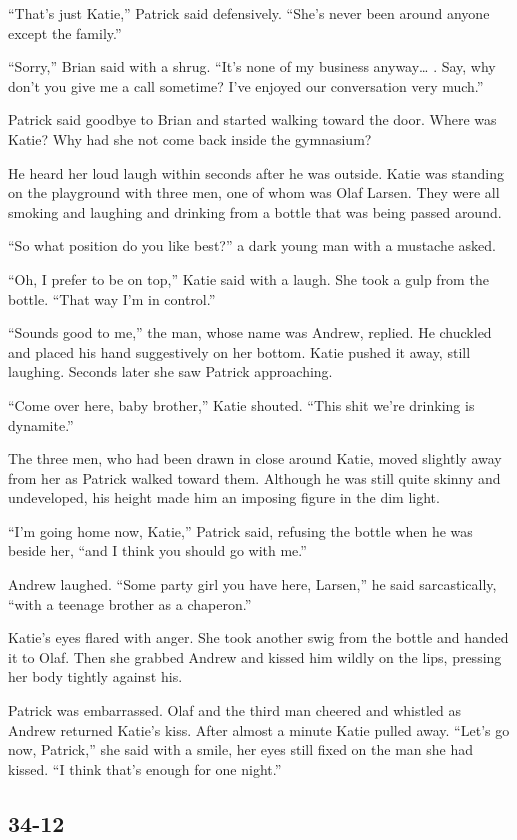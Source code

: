 \documentclass[]{article}
\begin{document}
{“That’s just Katie,” Patrick said defensively.  “She’s never been around anyone except the family.”

“Sorry,” Brian said with a shrug.  “It’s none of my business anyway… .  Say, why don’t you give me a call sometime? I’ve enjoyed our conversation very much.”

Patrick said goodbye to Brian and started walking toward the door.  Where was Katie? Why had she not come back inside the gymnasium?

He heard her loud laugh within seconds after he was outside.  Katie was standing on the playground with three men, one of whom was Olaf Larsen.  They were all smoking and laughing and drinking from a bottle that was being passed around.

“So what position do you like best?” a dark young man with a mustache asked.

“Oh, I prefer to be on top,” Katie said with a laugh.  She took a gulp from the bottle.  “That way I’m in control.”

“Sounds good to me,” the man, whose name was Andrew, replied.  He chuckled and placed his hand suggestively on her bottom.  Katie pushed it away, still laughing.  Seconds later she saw Patrick approaching.

“Come over here, baby brother,” Katie shouted.  “This shit we’re drinking is dynamite.”

The three men, who had been drawn in close around Katie, moved slightly away from her as Patrick walked toward them.  Although he was still quite skinny and undeveloped, his height made him an imposing figure in the dim light.

“I’m going home now, Katie,” Patrick said, refusing the bottle when he was beside her, “and I think you should go with me.”

Andrew laughed.  “Some party girl you have here, Larsen,” he said sarcastically, “with a teenage brother as a chaperon.”

Katie’s eyes flared with anger.  She took another swig from the bottle and handed it to Olaf.  Then she grabbed Andrew and kissed him wildly on the lips, pressing her body tightly against his.

Patrick was embarrassed.  Olaf and the third man cheered and whistled as Andrew returned Katie’s kiss.  After almost a minute Katie pulled away.  “Let’s go now, Patrick,” she said with a smile, her eyes still fixed on the man she had kissed.  “I think that’s enough for one night.”


\subsection*{34-12}

}
\end{document}
